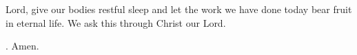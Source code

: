 \lettrine[loversize=0.15,lines=2]{L}{}ord,
give our bodies restful sleep
and let the work we have done today
bear fruit in eternal life.
We ask this through Christ our Lord.
\par \Rbar. Amen.
